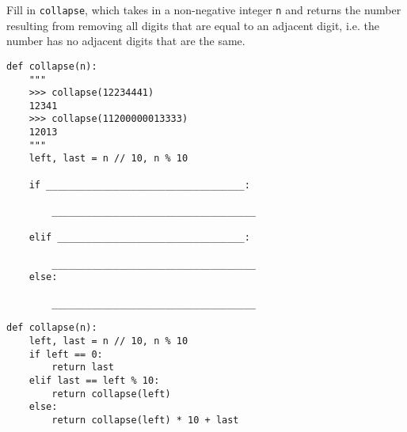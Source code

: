 \begin{blocksection}
\question
Fill in \lstinline{collapse}, which takes in a non-negative integer \lstinline{n} and returns the number resulting from removing all digits that are equal to an adjacent digit, i.e. the number has no adjacent digits that are the same.

\begin{lstlisting}
def collapse(n):
    """
    >>> collapse(12234441)
    12341
    >>> collapse(11200000013333)
    12013
    """
    left, last = n // 10, n % 10

    if ___________________________________:

        ____________________________________

    elif _________________________________:

        ____________________________________
    else:
    
        ____________________________________
\end{lstlisting}
\end{blocksection}

\begin{blocksection}
\begin{solution}
\begin{lstlisting}
def collapse(n):
    left, last = n // 10, n % 10
    if left == 0:
        return last
    elif last == left % 10:
        return collapse(left)
    else:
        return collapse(left) * 10 + last
\end{lstlisting}
\end{solution}
\end{blocksection}